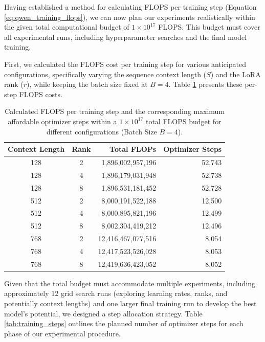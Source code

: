 \documentclass{article}
\begin{document}
Having established a method for calculating FLOPS per training step (Equation \ref{eq:qwen_training_flops}), we can now plan our experiments realistically within the given total computational budget of $1 \times 10^{17}$ FLOPS. This budget must cover all experimental runs, including hyperparameter searches and the final model training.

First, we calculated the FLOPS cost per training step for various anticipated configurations, specifically varying the sequence context length ($S$) and the LoRA rank ($r$), while keeping the batch size fixed at $B=4$. Table \ref{tab:flops_vs_steps} presents these per-step FLOPS costs.

\begin{table}[!th]
\renewcommand{\arraystretch}{1.4}
\centering
\setlength{\tabcolsep}{8pt} %
\begin{tabular}{ccrr}
    \toprule
    \textbf{Context Length} & \textbf{Rank} & \textbf{Total FLOPs} & \textbf{Optimizer Steps} \\
    \midrule
    128 & 2 &  1,896,002,957,196 & 52,743 \\
    128 & 4 &  1,896,179,031,948 & 52,738 \\
    128 & 8 &  1,896,531,181,452 & 52,728 \\
    \midrule %
    512 & 2 &  8,000,191,522,188 & 12,500 \\
    512 & 4 &  8,000,895,821,196 & 12,499 \\
    512 & 8 &  8,002,304,419,212 & 12,496 \\
    \midrule %
    768 & 2 & 12,416,467,077,516 & 8,054 \\
    768 & 4 & 12,417,523,526,028 & 8,053 \\
    768 & 8 & 12,419,636,423,052 & 8,052 \\
    \bottomrule
\end{tabular}
\caption{Calculated FLOPS per training step and the corresponding maximum affordable optimizer steps within a $1 \times 10^{17}$ total FLOPS budget for different configurations (Batch Size $B=4$).}
\label{tab:flops_vs_steps}
\end{table}

Given that the total budget must accommodate multiple experiments, including approximately 12 grid search runs (exploring learning rates, ranks, and potentially context lengths) and one larger final training run to develop the best model's potential, we designed a step allocation strategy. Table \ref{tab:training_steps} outlines the planned number of optimizer steps for each phase of our experimental procedure.
\end{document}
